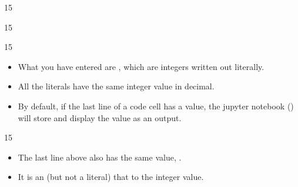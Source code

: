 \documentclass[letterpaper,10pt,english]{sphinxmanual}
\begin{document}
\begin{sphinxVerbatim}[commandchars=\\\{\}]
15
\end{sphinxVerbatim}

\begin{sphinxVerbatim}[commandchars=\\\{\}]
  
\end{sphinxVerbatim}

\begin{sphinxVerbatim}[commandchars=\\\{\}]
15
\end{sphinxVerbatim}

\begin{sphinxVerbatim}[commandchars=\\\{\}]
  
\end{sphinxVerbatim}

\begin{sphinxVerbatim}[commandchars=\\\{\}]
15
\end{sphinxVerbatim}

\begin{itemize}
\item {} 
What you have entered are , which are integers written out literally.

\item {} 
All the literals have the same integer value in decimal.

\item {} 
By default, if the last line of a code cell has a value, the jupyter notebook () will store and display the value as an output.

\end{itemize}

\begin{sphinxVerbatim}[commandchars=\\\{\}]
  
    
\end{sphinxVerbatim}

\begin{sphinxVerbatim}[commandchars=\\\{\}]
15
\end{sphinxVerbatim}
\begin{itemize}
\item {} 
The last line above also has the same value, .

\item {} 
It is an  (but not a literal) that  to the integer value.

\end{itemize}
\end{document}
